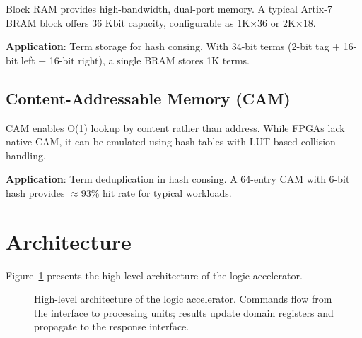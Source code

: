 \documentclass[11pt,a4paper]{article}
\begin{document}
Block RAM provides high-bandwidth, dual-port memory. A typical Artix-7 BRAM
block offers 36 Kbit capacity, configurable as 1K$\times$36 or 2K$\times$18.

\textbf{Application}: Term storage for hash consing. With 34-bit terms
(2-bit tag + 16-bit left + 16-bit right), a single BRAM stores 1K terms.

\subsection{Content-Addressable Memory (CAM)}
\label{subsec:cam_chirho}

CAM enables O(1) lookup by content rather than address. While FPGAs lack
native CAM, it can be emulated using hash tables with LUT-based collision
handling.

\textbf{Application}: Term deduplication in hash consing. A 64-entry CAM
with 6-bit hash provides $\approx$93\% hit rate for typical workloads.

\section{Architecture}
\label{sec:architecture_chirho}

Figure~\ref{fig:arch_chirho} presents the high-level architecture of the
logic accelerator.

\begin{figure}[ht]
\centering
{}
\caption{High-level architecture of the logic accelerator. Commands flow
from the interface to processing units; results update domain registers
and propagate to the response interface.}
\label{fig:arch_chirho}
\end{figure}
\end{document}
